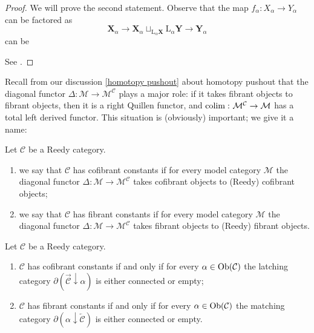 \begin{proof}
We will prove the second statement. Observe that the map $f_\alpha \colon X_\alpha \to Y_\alpha$ can be factored as
\[
\mathbf X_\alpha \to \mathbf X_\alpha \sqcup_{\mathrm L_\alpha \mathbf X} \mathrm L_\alpha \mathbf Y \to \mathbf Y_\alpha
\]
can be

See \cite[Proposition 15.3.11]{hirschhorn}.
\end{proof}

Recall from our discussion \ref{homotopy pushout} about homotopy pushout that the diagonal functor $\Delta \colon \mathcal M \to \mathcal M^{\mathcal C}$ plays a major role: if it takes fibrant objects to fibrant objects, then it is a right Quillen functor, and $\mathrm{colim} \, \colon \mathcal M^{\mathcal C} \to \mathcal M$ has a total left derived functor. This situation is (obviously) important; we give it a name:

\begin{defin} \label{def reedy cofibrant constants}
Let $\mathcal C$ be a Reedy category.
\begin{enumerate}
\item we say that $\mathcal C$ has cofibrant constants if for every model category $\mathcal M$ the diagonal functor $\Delta \colon \mathcal M \to \mathcal M^{\mathcal C}$ takes cofibrant objects to (Reedy) cofibrant objects;
\item we say that $\mathcal C$ has fibrant constants if for every model category $\mathcal M$ the diagonal functor $\Delta \colon \mathcal M \to \mathcal M^{\mathcal C}$ takes fibrant objects to (Reedy) fibrant objects.
\end{enumerate}
\end{defin}

\begin{prop} \label{prop reedy cofibrant constants}
Let $\mathcal C$ be a Reedy category.
\begin{enumerate}
\item $\mathcal C$ has cofibrant constants if and only if for every $\alpha \in \mathrm{Ob}(\mathcal C)$ the latching category $\partial (\overrightarrow{\mathcal C} \downarrow \alpha)$ is either connected or empty;
\item $\mathcal C$ has fibrant constants if and only if for every $\alpha \in \mathrm{Ob}(\mathcal C)$ the matching category $\partial (\alpha \downarrow \overleftarrow{\mathcal C} )$ is either connected or empty.
\end{enumerate}
\end{prop}

